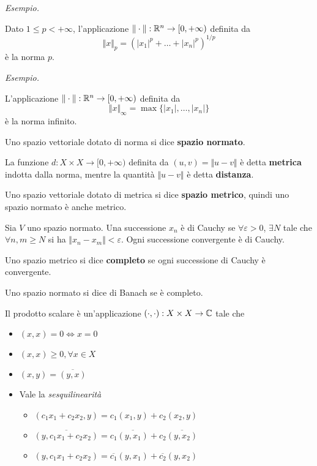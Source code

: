 \textit{Esempio.}

Dato $1 \leq p < + \infty $, l'applicazione $ \Vert \cdot \Vert : \mathbb{R}^{n}\rightarrow [0, + \infty)$ definita da
\begin{equation*}
\Vert x \Vert_{p} = \left(| x_{1}|^{p} + \dotsc + | x_{n}|^{p}\right)^{1/p}
\end{equation*}
è la norma $p$.

\textit{Esempio.}

L'applicazione $ \Vert \cdot \Vert : \mathbb{R}^{n}\rightarrow [0, + \infty)$ definita da
\begin{equation*}
\Vert x \Vert_{\infty} = \max\{| x_{1}|, \dotsc, | x_{n}| \}
\end{equation*}
è la norma infinito.
\begin{defn}
Uno spazio vettoriale dotato di norma si dice \textbf{spazio normato}.
\end{defn}
\begin{defn}
[Metrica]
La funzione $d: X\times X\rightarrow [0, + \infty)$ definita da $(u, v) = \Vert u - v \Vert $ è detta \textbf{metrica} indotta dalla norma, mentre la quantità $ \Vert u - v \Vert $ è detta \textbf{distanza}.
\end{defn}
\begin{defn}
Uno spazio vettoriale dotato di metrica si dice \textbf{spazio metrico}, quindi uno spazio normato è anche metrico.
\end{defn}
\begin{defn}
Sia $V$ uno spazio normato. Una successione $x_{n}$ è di Cauchy se $\forall \varepsilon > 0$, $\exists N$ tale che $\forall n, m \geq N$ si ha $ \Vert x_{n} - x_{m} \Vert < \varepsilon $. Ogni successione convergente è di Cauchy.
\end{defn}
\begin{defn}
Uno spazio metrico si dice \textbf{completo} se ogni successione di Cauchy è convergente.
\end{defn}
\begin{defn}
Uno spazio normato si dice di Banach se è completo.
\end{defn}
\begin{defn}
Il prodotto scalare è un'applicazione $( \cdot, \cdot) : X\times X\rightarrow \mathbb{C}$ tale che
\begin{itemize}
\item $(x, x) = 0\iff x = 0$
\item $(x, x) \geq 0, \forall x\in X$
\item $(x, y) = \overline{(y, x)}$
\item Vale la \textit{sesquilinearità}
\begin{itemize}
\item $(c_{1} x_{1} + c_{2} x_{2}, y) = c_{1}(x_{1}, y) + c_{2}(x_{2}, y)$
\item $\overline{(y, c_{1} x_{1} + c_{2} x_{2})} = c_{1}\overline{(y, x_{1})} + c_{2}\overline{(y, x_{2})}$
\item $(y, c_{1} x_{1} + c_{2} x_{2}) = \overline{c_{1}}(y, x_{1}) + \overline{c_{2}}(y, x_{2})$
\end{itemize}
\end{itemize}
\end{defn}
